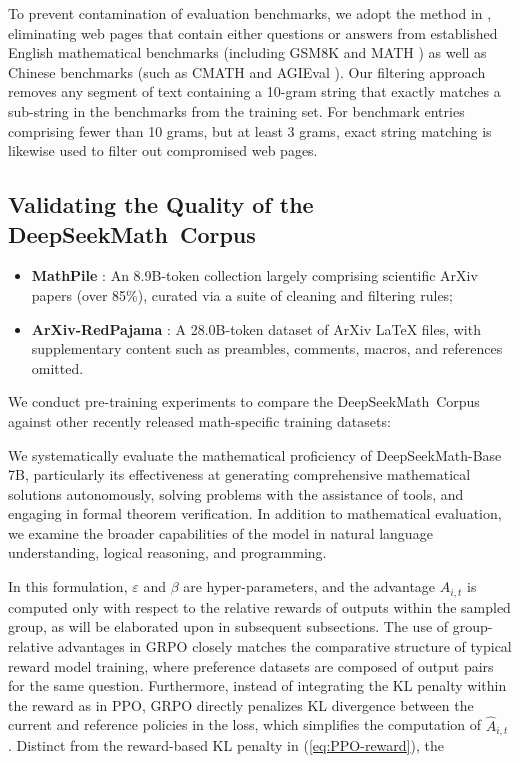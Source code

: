 To prevent contamination of evaluation benchmarks, we adopt the method in \cite{deepseek-coder}, eliminating web pages that contain either questions or answers from established English mathematical benchmarks (including GSM8K \citep{gsm8k} and MATH \citep{MATH}) as well as Chinese benchmarks (such as CMATH \citep{wei2023cmath} and AGIEval \citep{agieval}). Our filtering approach removes any segment of text containing a 10-gram string that exactly matches a sub-string in the benchmarks from the training set. For benchmark entries comprising fewer than 10 grams, but at least 3 grams, exact string matching is likewise used to filter out compromised web pages.

\subsection{Validating the Quality of the DeepSeekMath~Corpus}

\begin{itemize}[topsep=0pt]
    \item \textbf{MathPile} \citep{mathpile}: An 8.9B-token collection largely comprising scientific ArXiv papers (over 85\%), curated via a suite of cleaning and filtering rules;
    \item \textbf{ArXiv-RedPajama} \citep{redpajama}: A 28.0B-token dataset of ArXiv LaTeX files, with supplementary content such as preambles, comments, macros, and references omitted.
\end{itemize}

We conduct pre-training experiments to compare the DeepSeekMath~Corpus against other recently released math-specific training datasets:

We systematically evaluate the mathematical proficiency of DeepSeekMath-Base 7B, particularly its effectiveness at generating comprehensive mathematical solutions autonomously, solving problems with the assistance of tools, and engaging in formal theorem verification. In addition to mathematical evaluation, we examine the broader capabilities of the model in natural language understanding, logical reasoning, and programming.

In this formulation, $\varepsilon$ and $\beta$ are hyper-parameters, and the advantage $\hat{A}_{i,t}$ is computed only with respect to the relative rewards of outputs within the sampled group, as will be elaborated upon in subsequent subsections. The use of group-relative advantages in GRPO closely matches the comparative structure of typical reward model training, where preference datasets are composed of output pairs for the same question. Furthermore, instead of integrating the KL penalty within the reward as in PPO, GRPO directly penalizes KL divergence between the current and reference policies in the loss, which simplifies the computation of $\hat{A}_{i,t}$. Distinct from the reward-based KL penalty in (\ref{eq:PPO-reward}), the

